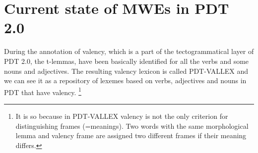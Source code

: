 %
%
%
%
%


\section{Current state of MWEs in PDT 2.0}
\label{sec:pdt:mwes}

During the annotation of valency, which is a part of the tectogrammatical layer of PDT 2.0, the t-lemmas, have been basically identified for all the verbs and some nouns and adjectives.
The resulting valency lexicon is called PDT-VALLEX \citep{hajic:2003} and we can see it as a repository of lexemes based on verbs, adjectives and nouns in PDT that have valency.
%
\footnote{It is so because in PDT-VALLEX valency is not the only criterion for distinguishing frames (=meanings). Two words with the same morphological lemma and valency frame are assigned two different frames if their meaning differs.} 

